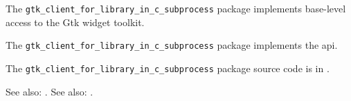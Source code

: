 
The {\tt gtk\_client\_for\_library\_in\_c\_subprocess} package implements base-level access to the Gtk widget 
toolkit.

The {\tt gtk\_client\_for\_library\_in\_c\_subprocess} package implements the  api.

The {\tt gtk\_client\_for\_library\_in\_c\_subprocess} package source code is in .

See also:  .
See also:  .


